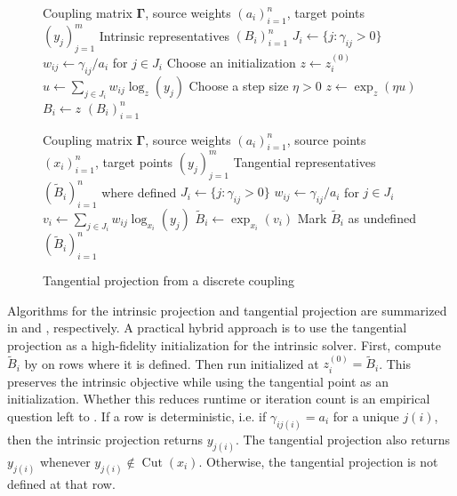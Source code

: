 \documentclass[10pt]{article} %
\theoremstyle{definition}
\providecommand{\1}{\mathbf{1}}
\providecommand{\mGamma}{\boldsymbol{\Gamma}}
\DeclareMathOperator{\Cut}{Cut}
\begin{document}
\begin{figure}[t]
\centering

\begin{minipage}[t]{0.48\linewidth}
\begin{algorithm}[H]
\caption{Intrinsic projection from a discrete coupling}
\label{alg:intrinsic_discrete}
\begin{algorithmic}[1]
\Require Coupling matrix $\mGamma$, source weights $(a_i)_{i=1}^n$,
target points $(y_j)_{j=1}^m$
\Ensure Intrinsic representatives $(B_i)_{i=1}^n$
    \State $J_i \gets \{j:\gamma_{ij}>0\}$
    \State $w_{ij} \gets \gamma_{ij}/a_i$ for $j\in J_i$
    \State Choose an initialization $z\gets z_i^{(0)}$
    \Repeat
        \State $u \gets \displaystyle\sum_{j\in J_i} w_{ij}\log_z(y_j)$
        \State Choose a step size $\eta>0$
        \State $z \gets \exp_z(\eta u)$
    \State $B_i \gets z$
\EndFor
\State \Return $(B_i)_{i=1}^n$
\end{algorithmic}
\end{algorithm}
\end{minipage}
\hfill
\begin{minipage}[t]{0.48\linewidth}
\begin{algorithm}[H]
\caption{Tangential projection from a discrete coupling}
\label{alg:tangential_discrete}
\begin{algorithmic}[1]
\Require Coupling matrix $\mGamma$, source weights $(a_i)_{i=1}^n$,
source points $(x_i)_{i=1}^n$, target points $(y_j)_{j=1}^m$
\Ensure Tangential representatives $(\widetilde B_i)_{i=1}^n$ where defined
    \State $J_i \gets \{j:\gamma_{ij}>0\}$
    \State $w_{ij} \gets \gamma_{ij}/a_i$ for $j\in J_i$
    \If{$y_j\notin\Cut(x_i)$ for all $j\in J_i$}
        \State $v_i \gets \displaystyle\sum_{j\in J_i} w_{ij}\log_{x_i}(y_j)$
        \State $\widetilde B_i \gets \exp_{x_i}(v_i)$
    \Else
        \State Mark $\widetilde B_i$ as undefined
    \EndIf
\EndFor
\State \Return $(\widetilde B_i)_{i=1}^n$
\end{algorithmic}
\end{algorithm}
\end{minipage}
\end{figure}



Algorithms for the intrinsic projection and tangential projection are summarized in  and , respectively. A practical hybrid approach is to use the tangential projection as a high-fidelity initialization for the intrinsic solver. First, compute $\widetilde B_i$ by  on rows where it is defined. Then run  initialized at $z_i^{(0)}=\widetilde B_i$. This preserves the intrinsic objective while using the tangential point as an initialization. Whether this reduces runtime or iteration count is an empirical question left to . If a row is deterministic, i.e. if $\gamma_{ij(i)}=a_i$ for a unique $j(i)$, then the intrinsic projection returns $y_{j(i)}$. The tangential projection also returns $y_{j(i)}$ whenever $y_{j(i)}\notin\Cut(x_i)$. Otherwise, the tangential projection is not defined at that row.
\end{document}
